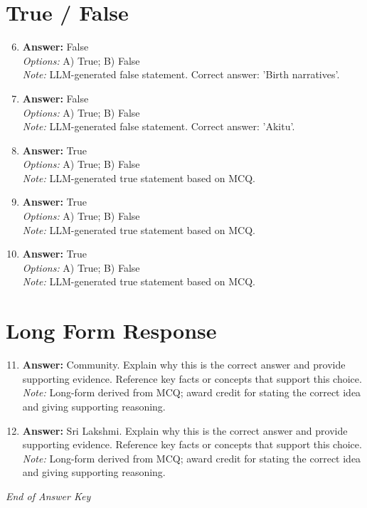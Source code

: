 \documentclass[12pt]{article}
\begin{document}
\section*{True / False}
\begin{enumerate}[label=\arabic*.]
\setcounter{enumi}{5}
\item \textbf{Answer:} False
\\ \textit{Options:} A) True; B) False
\\ \textit{Note:} LLM-generated false statement. Correct answer: 'Birth narratives'.
\item \textbf{Answer:} False
\\ \textit{Options:} A) True; B) False
\\ \textit{Note:} LLM-generated false statement. Correct answer: 'Akitu'.
\item \textbf{Answer:} True
\\ \textit{Options:} A) True; B) False
\\ \textit{Note:} LLM-generated true statement based on MCQ.
\item \textbf{Answer:} True
\\ \textit{Options:} A) True; B) False
\\ \textit{Note:} LLM-generated true statement based on MCQ.
\item \textbf{Answer:} True
\\ \textit{Options:} A) True; B) False
\\ \textit{Note:} LLM-generated true statement based on MCQ.
\end{enumerate}

\section*{Long Form Response}
\begin{enumerate}[label=\arabic*.]
\setcounter{enumi}{10}
\item \textbf{Answer:} Community. Explain why this is the correct answer and provide supporting evidence. Reference key facts or concepts that support this choice.
\\ \textit{Note:} Long-form derived from MCQ; award credit for stating the correct idea and giving supporting reasoning.
\item \textbf{Answer:} Sri Lakshmi. Explain why this is the correct answer and provide supporting evidence. Reference key facts or concepts that support this choice.
\\ \textit{Note:} Long-form derived from MCQ; award credit for stating the correct idea and giving supporting reasoning.
\end{enumerate}

\vfill
\noindent\textit{End of Answer Key}
\end{document}
